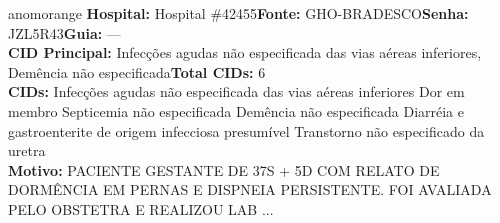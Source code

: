 \documentclass[a4paper,10pt]{article}
\begin{document}
\begin{anomalycard}[Interna\c{c}\~{a}o \#118437 | Pac. \#98258 | ALTO (z=3.01) | LOS: 3d | 24/02/2026\,$\to$\,27/02/2026]{anomorange}
\textbf{Hospital:} Hospital \#42455\quad \textbf{Fonte:} GHO-BRADESCO\quad \textbf{Senha:} JZL5R43\quad \textbf{Guia:} ---\\

\textbf{CID Principal:} {\small Infecções agudas não especificada das vias aéreas inferiores, Demência não especificada}\quad\textbf{Total CIDs:} 6\\

\textbf{CIDs:} {\scriptsize Infecções agudas não especificada das vias aéreas inferiores \textbar{} Dor em membro \textbar{} Septicemia não especificada \textbar{} Demência não especificada \textbar{} Diarréia e gastroenterite de origem infecciosa presumível \textbar{} Transtorno não especificado da uretra}\\

\textbf{Motivo:} {\scriptsize PACIENTE GESTANTE DE 37S + 5D COM RELATO DE DORMÊNCIA EM PERNAS E DISPNEIA PERSISTENTE. FOI AVALIADA PELO OBSTETRA E REALIZOU LAB ...}\\




\end{anomalycard}
\end{document}
